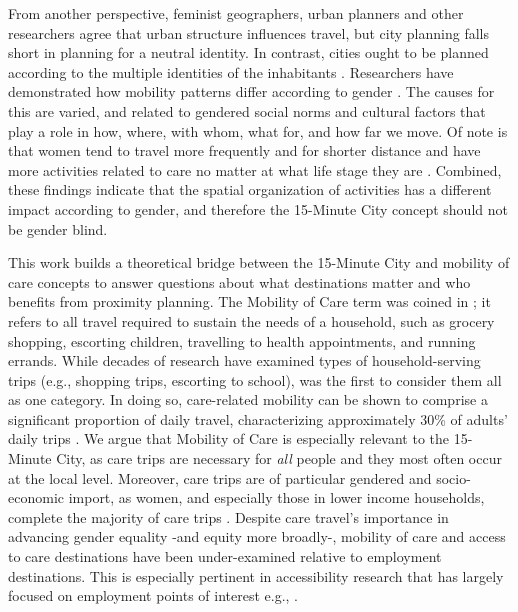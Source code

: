 \documentclass[
  authoryear,
  preprint,
  3p]{elsarticle}
\begin{document}
From another perspective, feminist geographers, urban planners and other
researchers agree that urban structure influences travel, but city
planning falls short in planning for a neutral identity. In contrast,
cities ought to be planned according to the multiple identities of the
inhabitants
\citep{vacchelli_towards_2018, urbandevelopmentviennaGenderMainstreamingUrban2013}.
Researchers have demonstrated how mobility patterns differ according to
gender
\citep{lawWomenTransportNew1999, cresswell_gendered_2008, levy2013travel, little_gender_1994, tronto_toward_1990, neto_gender_2015}.
The causes for this are varied, and related to gendered social norms and
cultural factors that play a role in how, where, with whom, what for,
and how far we move. Of note is that women tend to travel more
frequently and for shorter distance
\citep{roorda_triap_2010, morency_distance_2011} and have more
activities related to care \citep{ilo_care_2018} no matter at what life
stage they are \citep{garciaromanGenderDifferencesTime2022}. Combined,
these findings indicate that the spatial organization of activities has
a different impact according to gender, and therefore the 15-Minute City
concept should not be gender blind.

This work builds a theoretical bridge between the 15-Minute City and
mobility of care concepts to answer questions about what destinations
matter and who benefits from proximity planning. The Mobility of Care
term was coined in
\citet{sanchezdemadariagaMobilityCareIntroducing2013}; it refers to all
travel required to sustain the needs of a household, such as grocery
shopping, escorting children, travelling to health appointments, and
running errands. While decades of research have examined types of
household-serving trips (e.g., shopping trips, escorting to school),
\citet{sanchezdemadariagaMobilityCareIntroducing2013} was the first to
consider them all as one category. In doing so, care-related mobility
can be shown to comprise a significant proportion of daily travel,
characterizing approximately 30\% of adults' daily trips
\citep{sanchezdemadariagaMobilityCareIntroducing2013, sanchezdemadariagaMeasuringMobilitiesCare2019, ravensbergen2023exploratory}.
We argue that Mobility of Care is especially relevant to the 15-Minute
City, as care trips are necessary for \emph{all} people and they most
often occur at the local level. Moreover, care trips are of particular
gendered and socio-economic import, as women, and especially those in
lower income households, complete the majority of care trips
\citep{ravensbergen2023exploratory}. Despite care travel's importance in
advancing gender equality -and equity more broadly-, mobility of care
and access to care destinations have been under-examined relative to
employment destinations. This is especially pertinent in accessibility
research that has largely focused on employment points of interest e.g.,
\citep{farberOntarioLineSocioeconomic2019, duarteInfluenceJobAccessibility2023, ryanAccessibilitySpaceTime2023}.
\end{document}
